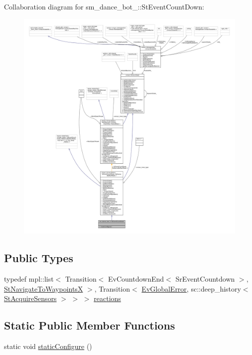 Collaboration diagram for sm\+\_\+dance\+\_\+bot\+\_\+:\+:St\+Event\+Count\+Down\+:
\nopagebreak
\begin{figure}[H]
\begin{center}
\leavevmode
\includegraphics[width=350pt]{structsm__dance__bot__3_1_1StEventCountDown__coll__graph}
\end{center}
\end{figure}
\subsection*{Public Types}
\begin{DoxyCompactItemize}
\item 
typedef mpl\+::list$<$ Transition$<$ Ev\+Countdown\+End$<$ Sr\+Event\+Countdown $>$, \hyperlink{structsm__dance__bot__3_1_1StNavigateToWaypointsX}{St\+Navigate\+To\+WaypointsX} $>$, Transition$<$ \hyperlink{structsm__dance__bot__3_1_1EvGlobalError}{Ev\+Global\+Error}, sc\+::deep\+\_\+history$<$ \hyperlink{structsm__dance__bot__3_1_1StAcquireSensors}{St\+Acquire\+Sensors} $>$ $>$ $>$ \hyperlink{structsm__dance__bot__3_1_1StEventCountDown_a381755fc445b431bc0bbbf78bb53b274}{reactions}
\end{DoxyCompactItemize}
\subsection*{Static Public Member Functions}
\begin{DoxyCompactItemize}
\item 
static void \hyperlink{structsm__dance__bot__3_1_1StEventCountDown_a7d2e09cc803cdebdcadea62a6f193cf5}{static\+Configure} ()
\end{DoxyCompactItemize}

